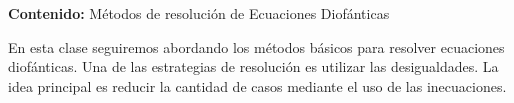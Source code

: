 {\Large\textbf{Contenido:} Métodos de resolución de Ecuaciones Diofánticas}

En esta clase seguiremos abordando los métodos básicos para resolver ecuaciones diofánticas.
Una de las estrategias de resolución es utilizar las desigualdades.
La idea principal es reducir la cantidad de casos mediante el uso de las inecuaciones.